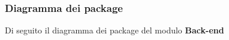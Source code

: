 \subsubsection{Diagramma dei package}
Di seguito il diagramma dei package del modulo \textbf{Back-end}